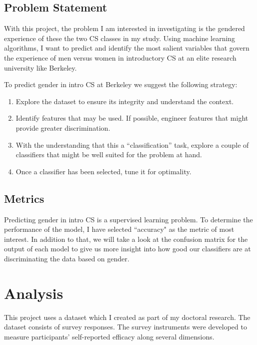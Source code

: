 \documentclass[twoside,openright,titlepage,numbers=noenddot,headinclude,%
               footinclude=true,cleardoublepage=empty,abstractoff,BCOR=5mm,%
               paper=a4,fontsize=11pt,ngerman,american]{scrreprt}
\numberwithin{theorem}{chapter}
\numberwithin{definition}{chapter}
\numberwithin{algorithm}{chapter}
\numberwithin{figure}{chapter}
\numberwithin{table}{chapter}
\numberwithin{equation}{chapter}
\begin{document}
\section*{Problem Statement}

With this project, the problem I am interested in investigating is the gendered experience of these the two CS classes in my study. Using machine learning algorithms, I want to predict and identify the most salient variables that govern the experience of men versus women in introductory CS at an elite research university like Berkeley.

To predict gender in intro CS at Berkeley we suggest the following strategy:
\begin{enumerate}%
\item Explore the dataset to ensure its integrity and understand the context.
\item Identify features that may be used. If possible, engineer features that might provide greater discrimination.
\item With the understanding that this a ``classification'' task, explore a couple of classifiers that might be well suited for the problem at hand.
\item Once a classifier has been selected, tune it for optimality.
\end{enumerate}

\section*{Metrics}


Predicting gender in intro CS is a supervised learning problem. To determine the performance of the model, I have selected ``accuracy" as the metric of most interest. In addition to that, we will take a look at the confusion matrix for the output of each model to give us more insight into how good our classifiers are at discriminating the data based on gender. 


\chapter*{Analysis}

This project uses a dataset which I created as part of my doctoral research. The dataset consists of survey responses. The survey instruments were developed to measure participants' self-reported efficacy along several dimensions. 
\end{document}
